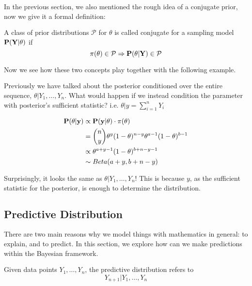 In the previous section, we also mentioned the rough idea of a conjugate prior, now we give it a formal definition:
\begin{definition}
    A class of prior distributions $\mathcal{P}$ for $\theta$ is called conjugate for a sampling model $\bf{P}(Y|\theta)$ if
    \begin{equation*}
        \pi(\theta) \in \mathcal{P} \Rightarrow \bf{P}(\theta | Y) \in \mathcal{P}
    \end{equation*}
\end{definition}

Now we see how these two concepts play together with the following example.
\begin{example}
    Previously we have talked about the posterior conditioned over the entire sequence, $\theta | Y_1, \ldots, Y_n$. What would happen if we instead condition the parameter with posterior's sufficient statistic? i.e. $\theta | y=\sum_{i=1}^{n}Y_i$

    \begin{align*}
        \bf{P}(\theta | y) &\propto \bf{P}(y | \theta) \cdot \pi(\theta) \\
        &= \binom{n}{y} \theta^{y}(1-\theta)^{n-y} \theta^{a-1}(1-\theta)^{b-1} \\
        &\propto \theta^{a + y - 1}(1-\theta)^{b + n - y - 1} \\
        &\sim Beta(a+y, b+n-y)
    \end{align*}

    Surprisingly, it looks the same as $\theta | Y_1, \ldots, Y_n$! This is because $y$, as the sufficient statistic for the posterior, is enough to determine the distribution.
\end{example}

\subsection{Predictive Distribution}
There are two main reasons why we model things with mathematics in general: to explain, and to predict. In this section, we explore how can we make predictions within the Bayesian framework.

\begin{definition}
    Given data points $Y_1, \ldots, Y_n$, the predictive distribution refers to
    \begin{equation*}
        Y_{n+1}|Y_1, \ldots, Y_n
    \end{equation*}
\end{definition}

